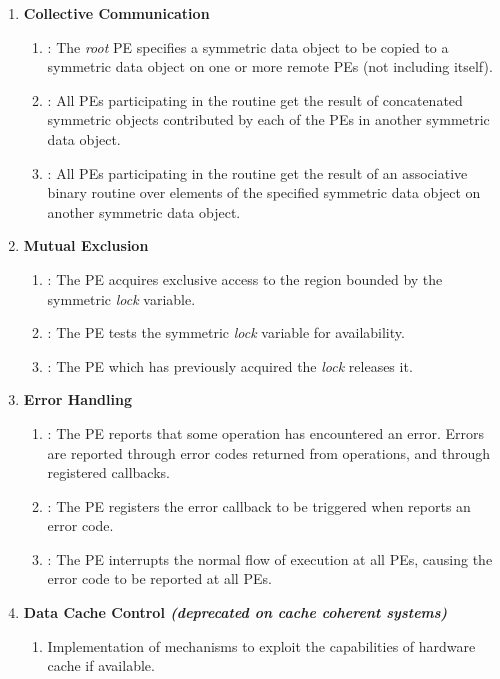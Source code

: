 \begin{enumerate}
\item \textbf{Collective Communication}
\begin{enumerate}
  \item {}: The \textit{root} \ac{PE} specifies a symmetric data
      object to be copied to a symmetric data object on one or more remote
      \acp{PE} (not including itself). 
  \item {}: All \acp{PE} participating in the routine get the result
      of concatenated symmetric objects contributed by each of the \acp{PE} in
      another symmetric data object.
  \item {}: All \acp{PE} participating in the routine get the result
      of an associative binary routine over elements of the specified symmetric
      data object on another symmetric data object. 
\end{enumerate}

\item \textbf{Mutual Exclusion}
\begin{enumerate}
  \item {}: The \ac{PE} acquires exclusive access to the region
      bounded by the symmetric \textit{lock} variable.
  \item {}: The \ac{PE} tests the symmetric \textit{lock} variable
      for availability.
  \item {}: The \ac{PE} which has previously acquired the
      \textit{lock} releases it.
\end{enumerate}

\item \textbf{Error Handling}
\begin{enumerate}
  \item {}: The \ac{PE} reports that some operation has encountered 
      an error. Errors are reported through error codes returned from \openshmem 
      operations, and through registered callbacks.
  \item {}: The \ac{PE} registers the error callback to be triggered
      when \openshmem reports an error code.
  \item {}: The \ac{PE} interrupts the normal flow of execution at all 
      \acp{PE}, causing the error code to be reported at all \acp{PE}.
\end{enumerate}

\item \textbf{Data Cache Control \textit{(deprecated on cache coherent systems)}}
\begin{enumerate}
  \item Implementation of mechanisms to exploit the capabilities of hardware cache
      if available.
\end{enumerate}
\end{enumerate}
